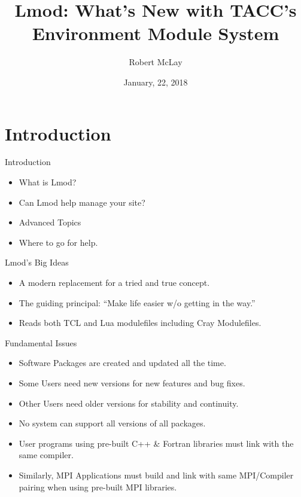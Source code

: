 \documentclass{beamer}
\title{Lmod: What's New with TACC's Environment Module System}
\author{Robert McLay}
\institute{The Texas Advanced Computing Center}
\date{January, 22, 2018}  %
\begin{document}
\begin{frame}
  \titlepage
\end{frame}

\section{Introduction}

\begin{frame}{Introduction}
  \begin{itemize}
    \item What is Lmod?
    \item Can Lmod help manage your site?
    \item Advanced Topics
    \item Where to go for help.
  \end{itemize}
\end{frame}

\begin{frame}{Lmod's Big Ideas}
  \begin{itemize}
    \item A modern replacement for a tried and true concept.
    \item The guiding principal: ``Make life easier w/o getting in
      the way.''
    \item Reads both TCL and Lua modulefiles including Cray Modulefiles.
  \end{itemize}
\end{frame}

\begin{frame}{Fundamental Issues}
  \begin{itemize}
    \item Software Packages are created and updated all the time.
    \item Some Users need new versions for new features and bug fixes.
    \item Other Users need older versions for stability and continuity.
    \item No system can support all versions of all packages.
    \item User programs using pre-built C++ \& Fortran libraries must link with the same compiler.
    \item Similarly, MPI Applications must build and link with same
      MPI/Compiler pairing when using pre-built MPI libraries.
  \end{itemize}
\end{frame}
\end{document}
